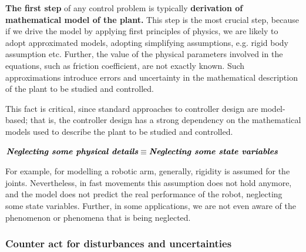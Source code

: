     \textbf{The first step} of any control problem is typically \textbf{derivation of mathematical model of the plant.} This step is the most crucial step, because if we drive the model by applying first principles of physics, we are likely to adopt approximated models, adopting simplifying assumptions, e.g. rigid body assumption etc. Further, the value of the physical parameters involved in the equations, such as friction coefficient, are not exactly known. Such approximations introduce errors and uncertainty in the mathematical description of the plant to be studied and controlled.

    This fact is critical, since standard approaches to controller design are model-based; that is, the controller design has a strong dependency on the mathematical models used to describe the plant to be studied and controlled.


\begin{center}
$\textit{\textbf{Neglecting some physical details}} \equiv \textit{\textbf{Neglecting some state variables}}$
\end{center}

    For example, for modelling a robotic arm, generally, rigidity is assumed for the joints. Nevertheless, in fast movements  this assumption does not hold anymore, and the model does not predict the real performance of the robot, neglecting some state variables. Further, in some applications, we are not even aware of the phenomenon or phenomena that is being neglected. 

\subsubsection{Counter act for disturbances and uncertainties}

